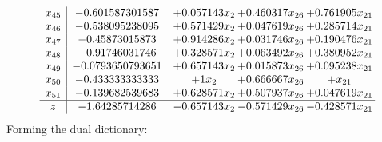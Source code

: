 \documentclass[11pt]{article}
\begin{document}
\[\begin{array}{c| c c@{\hskip 2pt} c@{\hskip 2pt} c@{\hskip 2pt} }
 x_{45}   &  -0.601587301587 & + 0.057143 x_{2} & + 0.460317 x_{26} & + 0.761905 x_{21}\\
 x_{46}   &  -0.538095238095 & + 0.571429 x_{2} & + 0.047619 x_{26} & + 0.285714 x_{21}\\
 x_{47}   &  -0.45873015873 & + 0.914286 x_{2} & + 0.031746 x_{26} & + 0.190476 x_{21}\\
 x_{48}   &  -0.91746031746 & + 0.328571 x_{2} & + 0.063492 x_{26} & + 0.380952 x_{21}\\
 x_{49}   &  -0.0793650793651 & + 0.657143 x_{2} & + 0.015873 x_{26} & + 0.095238 x_{21}\\
 x_{50}   &  -0.433333333333 & + 1 x_{2} & + 0.666667 x_{26} & +  x_{21}\\
 x_{51}   &  -0.139682539683 & + 0.628571 x_{2} & + 0.507937 x_{26} & + 0.047619 x_{21}\\
\hline
z    &  -1.64285714286 & -0.657143 x_{2} & -0.571429 x_{26} & -0.428571 x_{21}\\
\end{array}\]
Forming the dual dictionary:
\end{document}
